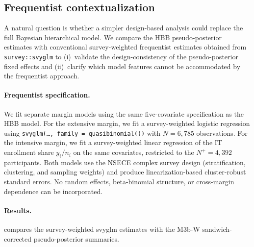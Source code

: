 
\subsection{Frequentist contextualization}
\label{smf:frequentist}

A natural question is whether a simpler design-based analysis could
replace the full Bayesian hierarchical model.  We compare the HBB
pseudo-posterior estimates with conventional survey-weighted frequentist
estimates obtained from \texttt{survey::svyglm}
\citep{Lumley2004,Lumley2020} to (i)~validate the design-consistency
of the pseudo-posterior fixed effects and (ii)~clarify which model
features cannot be accommodated by the frequentist approach.

\paragraph{Frequentist specification.}
We fit separate margin models using the same five-covariate
specification as the HBB model.  For the extensive margin, we fit a
survey-weighted logistic regression using
\texttt{svyglm(\ldots, family = quasibinomial())} with $N = 6{,}785$
observations.  For the intensive margin, we fit a survey-weighted
linear regression of the IT enrollment share $y_i / n_i$ on the same
covariates, restricted to the $N^{+} = 4{,}392$ participants.  Both
models use the NSECE complex survey design (stratification, clustering,
and sampling weights) and produce linearization-based cluster-robust
standard errors.  No random effects, beta-binomial structure, or
cross-margin dependence can be incorporated.

\paragraph{Results.}
 compares the survey-weighted svyglm
estimates with the M3b-W sandwich-corrected pseudo-posterior summaries.

\begin{table}[htbp]
\centering
\caption{Frequentist contextualization: survey-weighted svyglm vs.\
  Bayesian HBB (M3b-W, sandwich-corrected) point estimates and standard
  errors.  The extensive margin uses logistic link in both approaches;
  the intensive margin uses an identity link (svyglm) vs.\ logit link
  (HBB), so the scales differ.  SE Ratio $=$ HBB sandwich SE / svyglm SE.}
\label{smf:tab-frequentist}

\end{table}

